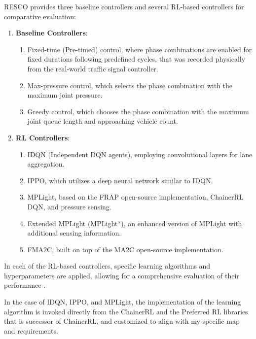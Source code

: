 RESCO provides three baseline controllers and several RL-based controllers for comparative evaluation:

\begin{enumerate}
    \item \textbf{Baseline Controllers}:
    \begin{enumerate}
        \item Fixed-time (Pre-timed) control, where phase combinations are enabled for fixed durations following predefined cycles, that was recorded physically from the real-world traffic signal controller.
        \item Max-pressure control, which selects the phase combination with the maximum joint pressure. \cite{chen2020toward}
        \item Greedy control, which chooses the phase combination with the maximum joint queue length and approaching vehicle count.\cite{ma2020feudal}
    \end{enumerate}
    
    \item \textbf{RL Controllers}:
    \begin{enumerate}
        \item IDQN (Independent DQN agents), employing convolutional layers for lane aggregation\cite{ault2020learning}.
        \item IPPO, which utilizes a deep neural network similar to IDQN\cite{ault2020learning}.
        \item MPLight, based on the FRAP open-source implementation, ChainerRL DQN\cite{ChainerRL}, and pressure sensing\cite{zheng2019learning}.
        \item Extended MPLight (MPLight*), an enhanced version of MPLight with additional sensing information.
        \item FMA2C, built on top of the MA2C open-source implementation\cite{chu2019multi}.
    \end{enumerate}
\end{enumerate}

In each of the RL-based controllers, specific learning algorithms and hyperparameters are applied, allowing for a comprehensive evaluation of their performance \cite{ault2020learning, chen2020toward, chu2019multi, ma2020feudal, zheng2019learning}.

In the case of IDQN, IPPO, and MPLight, the implementation of the learning algorithm is invoked directly from the ChainerRL \cite{ChainerRL} and the Preferred RL \cite{ChainerRL} libraries that is successor of ChainerRL, and customized to align with my specific map and requirements.

